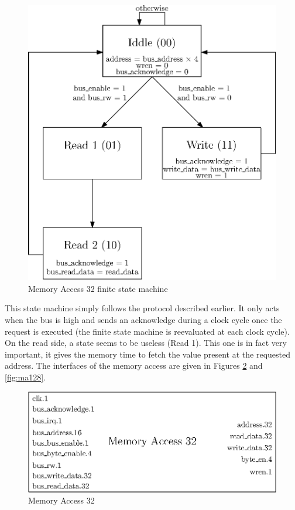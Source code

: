 \begin{figure}[ht!]
    \center
    \includegraphics[scale=0.8]{"Chapter5-MAU_CTRLU/res/mau_fsm"}
    \caption{Memory Access 32 finite state machine}
    \label{fig:ma_fsm}
\end{figure}

This state machine simply follows the protocol described earlier. It only acts when the bus is high 
and sends an acknowledge during a clock cycle once the request is executed (the finite state machine 
is reevaluated at each clock cycle). On the read side, a state seems to be useless (Read 1). This 
one is in fact very important, it gives the memory time to fetch the value present at the requested 
address. The interfaces of the memory access are given in Figures \ref{fig:ma32} and \ref{fig:ma128}.

\begin{figure}[ht!]
    \center
    \includegraphics[scale=0.8]{"Chapter5-MAU_CTRLU/res/memory_access_32"}
    \caption{Memory Access 32}
    \label{fig:ma32}
\end{figure}

